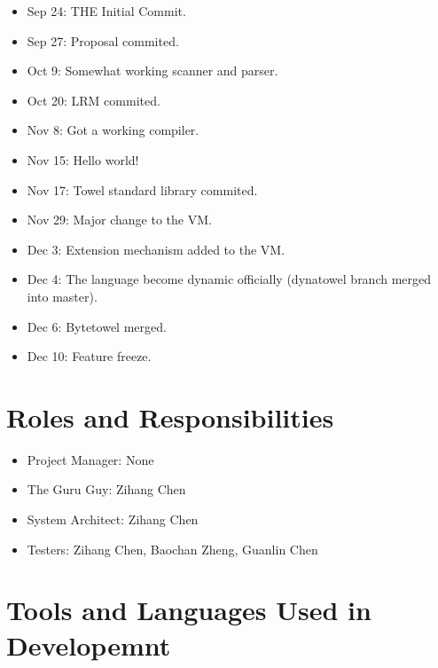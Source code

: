 \documentclass{report}
\begin{document}
\begin{itemize}
\item Sep 24: THE Initial Commit.
\item Sep 27: Proposal commited.
\item Oct 9: Somewhat working scanner and parser.
\item Oct 20: LRM commited.
\item Nov 8: Got a working compiler.
\item Nov 15: Hello world!
\item Nov 17: Towel standard library commited.
\item Nov 29: Major change to the VM.
\item Dec 3: Extension mechanism added to the VM.
\item Dec 4: The language become dynamic officially (dynatowel branch merged into master).
\item Dec 6: Bytetowel merged.
\item Dec 10: Feature freeze.
\end{itemize}

\section{Roles and Responsibilities}

\begin{itemize}
\item Project Manager: None
\item The Guru Guy: Zihang Chen
\item System Architect: Zihang Chen
\item Testers: Zihang Chen, Baochan Zheng, Guanlin Chen
\end{itemize}
\section{Tools and Languages Used in Developemnt}
\end{document}
